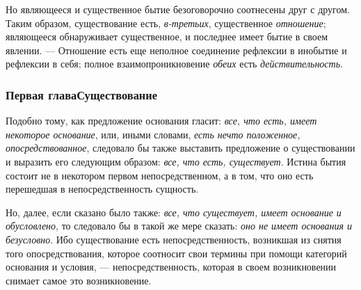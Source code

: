 Но являющееся и существенное бытие безоговорочно соотнесены друг с другом.
Таким образом, существование есть, {\em в-третьих},
существенное {\em отношение}; являющееся обнаруживает
существенное, и последнее имеет бытие в своем явлении. — Отношение есть еще
неполное соединение рефлексии в инобытие и рефлексии в себя; полное
взаимопроникновение {\em обеих} есть
{\em действительность}.

\subsubsection{Первая главаСуществование}
Подобно тому, как предложение основания гласит:
{\em все, что есть, имеет некоторое основание}, или,
иными словами, {\em есть нечто положенное,
опосредствованное}, следовало бы также выставить предложение о
существовании и выразить его следующим образом:
{\em все, что есть, существует}. Истина бытия состоит
не в некотором первом непосредственном, а в том, что оно есть перешедшая в
непосредственность сущность.

Но, далее, если сказано было также: {\em все, что
существует, имеет основание и обусловлено}, то следовало бы в такой же мере
сказать: {\em оно не имеет основания и безусловно}. Ибо
существование есть непосредственность, возникшая из снятия того
опосредствования, которое соотносит свои термины при помощи категорий
основания и условия, — непосредственность, которая в своем возникновении
снимает самое это возникновение.

